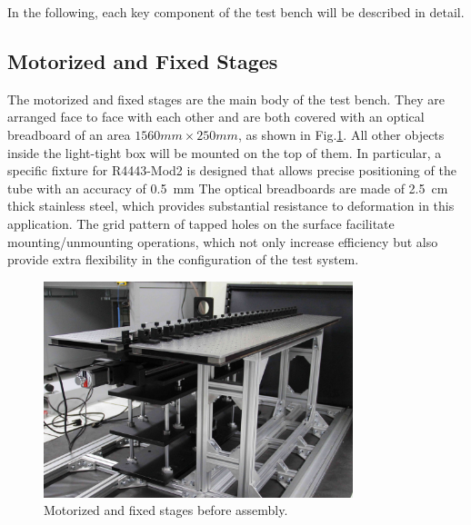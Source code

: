 \documentclass[5p, times]{elsarticle}
\begin{document}
In the following, each key component of the test bench will be described in detail.
\subsection{Motorized and Fixed Stages}
\label{sec:stages}

The motorized and fixed stages are the main body of the test bench.
They are arranged face to face with each other and are both covered with an optical breadboard of an area $1560mm\times250mm$, as shown in Fig.\ref{fig:stages}.
All other objects inside the light-tight box will be mounted on the top of them.
In particular, a specific fixture for R4443-Mod2 is designed that allows precise positioning of the tube with an accuracy of \textpm\SI{0.5}{\milli\meter}
The optical breadboards are made of \SI{2.5}{cm} thick stainless steel, which provides substantial resistance to deformation in this application.
The grid pattern of tapped holes on the surface facilitate mounting/unmounting operations, which not only increase efficiency but also provide extra flexibility in the configuration of the test system.

\begin{figure}[h!]
 \centering
 \includegraphics[width=90mm]{stage1_crop}
\caption{Motorized and fixed stages before assembly.}
\label{fig:stages}
\end{figure} 
\end{document}
